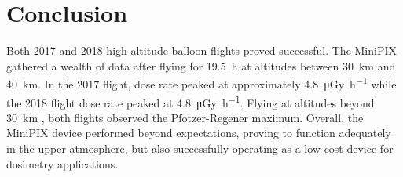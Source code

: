 \section{Conclusion}
\label{Conclusion}
Both 2017 and 2018 high altitude balloon flights proved successful.  
The MiniPIX gathered a wealth of data after flying for \SI{19.5}{\hour} at altitudes between \SI{30}{\kilo\meter} and \SI{40}{\kilo\meter}.  
In the 2017 flight, dose rate peaked at approximately \SI{4.8}{\micro\gray\per\hour} while the 2018 flight dose rate peaked at \SI{4.8}{\micro\gray\per\hour}.  
Flying at altitudes beyond \SI{30}{\kilo\meter} , both flights observed the Pfotzer-Regener maximum.
Overall, the MiniPIX device performed beyond expectations, proving to function adequately in the upper atmosphere, but also successfully operating as a low-cost device for dosimetry applications.
%
